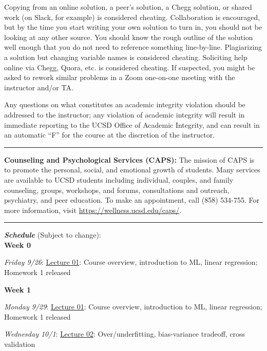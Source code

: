 \documentclass[12pt]{article}
\begin{document}
Copying from an online solution, a peer's solution, a Chegg solution, or shared work (on Slack, for example) is considered cheating.
Collaboration is encouraged, but by the time you start writing your own solution to turn in, you should not be looking at any other source.
You should know the rough outline of the solution well enough that you do not need to reference something line-by-line.
Plagiarizing a solution but changing variable names is considered cheating.
Soliciting help online via Chegg, Quora, etc. is considered cheating.
If suspected, you might be asked to rework similar problems in a Zoom one-on-one meeting with the instructor and/or TA.

Any questions on what constitutes an academic integrity violation should be addressed to the instructor; any violation of academic integrity will result in immediate reporting to the UCSD Office of Academic Integrity, and can result in an automatic ``F'' for the course at the discretion of the instructor.

\begin{center}
	\rule{\textwidth}{0.5pt}
\end{center}

\noindent\textbf{Counseling and Psychological Services (CAPS):} The mission of CAPS is to promote the personal, social, and emotional growth of students.
Many services are available to UCSD students including individual, couples, and family counseling, groups, workshops, and forums, consultations and outreach, psychiatry, and peer education.
To make an appointment, call (858) 534-755.
For more information, visit \href{https://wellness.ucsd.edu/caps/}{https://wellness.ucsd.edu/caps/}.

\begin{center}
	\rule{\textwidth}{0.5pt}
\end{center}

\noindent\textbf{\emph{Schedule}} (Subject to change):\\

\noindent\textbf{Week 0}

\emph{Friday 9/26}: \underline{Lecture 01}: Course overview, introduction to ML, linear regression; Homework 1 released

\noindent\textbf{Week 1}

\emph{Monday 9/29}: \underline{Lecture 01}: Course overview, introduction to ML, linear regression; Homework 1 released

\emph{Wednesday 10/1}: \underline{Lecture 02}: Over/underfitting, bias-variance tradeoff, cross validation
\end{document}

